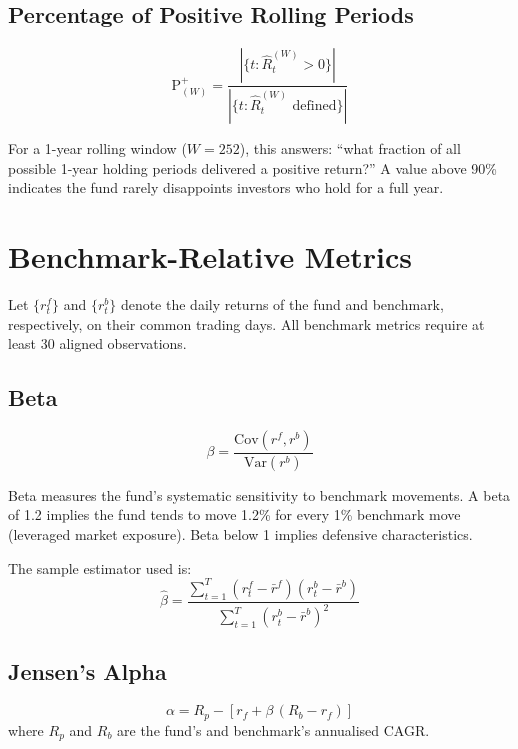 \documentclass[12pt, a4paper]{article}
\newcommand{\rf}{r_f}
\newcommand{\Var}{\mathrm{Var}}
\newcommand{\Cov}{\mathrm{Cov}}
\begin{document}
\subsection{Percentage of Positive Rolling Periods}

\[
  \text{P}^+_{(W)} = \frac{|\{t : \hat{R}_t^{(W)} > 0\}|}{|\{t : \hat{R}_t^{(W)} \text{ defined}\}|}
\]

For a 1-year rolling window ($W = 252$), this answers: ``what fraction of
all possible 1-year holding periods delivered a positive return?''  A
value above 90\% indicates the fund rarely disappoints investors who hold
for a full year.

\section{Benchmark-Relative Metrics}

Let $\{r_t^f\}$ and $\{r_t^b\}$ denote the daily returns of the fund and
benchmark, respectively, on their common trading days.  All benchmark
metrics require at least 30 aligned observations.

\subsection{Beta}

\begin{definition}[Beta]
\[
  \beta = \frac{\Cov(r^f, r^b)}{\Var(r^b)}
\]
\end{definition}

Beta measures the fund's systematic sensitivity to benchmark movements.
A beta of 1.2 implies the fund tends to move 1.2\% for every 1\% benchmark
move (leveraged market exposure).  Beta below 1 implies defensive
characteristics.

The sample estimator used is:
\[
  \hat{\beta} = \frac{\sum_{t=1}^{T}(r_t^f - \bar{r}^f)(r_t^b - \bar{r}^b)}
               {\sum_{t=1}^{T}(r_t^b - \bar{r}^b)^2}
\]

\subsection{Jensen's Alpha}

\begin{definition}
\[
  \alpha = R_p - \left[\rf + \beta\,(R_b - \rf)\right]
\]
where $R_p$ and $R_b$ are the fund's and benchmark's annualised CAGR.
\end{definition}
\end{document}
